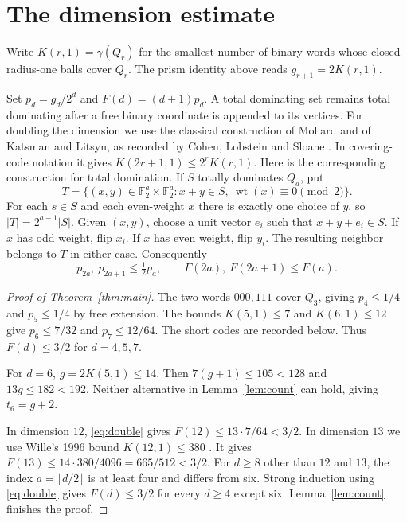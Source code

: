 \documentclass[11pt,a4paper]{article}
\newcommand{\F}{\mathbb F}
\newcommand{\wt}{\operatorname{wt}}
\begin{document}
\section{The dimension estimate}

Write $K(r,1)=\gamma(Q_r)$ for the smallest number of binary
words whose closed radius-one balls cover $Q_r$. The prism identity
above reads $g_{r+1}=2K(r,1)$.

Set $p_d=g_d/2^d$ and $F(d)=(d+1)p_d$. A total dominating set remains
total dominating after a free binary coordinate is appended to its
vertices. For doubling the dimension we use the classical construction
of Mollard and of Katsman and Litsyn, as recorded by Cohen, Lobstein
and Sloane \cite[Theorem 13]{cls}. In covering-code notation it gives
$K(2r+1,1)\le2^rK(r,1)$. Here is the corresponding construction for
total domination. If $S$ totally dominates $Q_a$, put
\[
  T=\{(x,y)\in \F_2^a\times\F_2^a:
           x+y\in S,\ \wt(x)\equiv0\pmod 2\}.
\]
For each $s\in S$ and each even-weight $x$ there is exactly one choice of
$y$, so $|T|=2^{a-1}|S|$. Given $(x,y)$, choose a unit vector $e_i$
such that $x+y+e_i\in S$. If $x$ has odd weight, flip $x_i$. If $x$
has even weight, flip $y_i$. The resulting neighbor belongs to $T$ in
either case. Consequently
\begin{equation}\label{eq:double}
  p_{2a},\ p_{2a+1}\le \tfrac12p_a,
  \qquad F(2a),\ F(2a+1)\le F(a).
\end{equation}

\begin{proof}[Proof of Theorem~\ref{thm:main}]
The two words $000,111$ cover $Q_3$, giving $p_4\le1/4$ and
$p_5\le1/4$ by free extension. The bounds $K(5,1)\le7$ and
$K(6,1)\le12$ give $p_6\le7/32$ and $p_7\le12/64$.
The short codes are recorded below. Thus $F(d)\le3/2$ for $d=4,5,7$.

For $d=6$, $g=2K(5,1)\le14$.
Then $7(g+1)\le105<128$ and $13g\le182<192$. Neither alternative in
Lemma~\ref{lem:count} can hold, giving $t_6=g+2$.

In dimension $12$, \eqref{eq:double} gives $F(12)\le13\cdot7/64<3/2$.
In dimension $13$ we use Wille's 1996 bound $K(12,1)\le380$ \cite{wille}.
It gives $F(13)\le14\cdot380/4096=665/512<3/2$.
For $d\ge8$ other than $12$ and $13$, the index
$a=\lfloor d/2\rfloor$ is at least four and differs from six.
Strong induction using \eqref{eq:double} gives $F(d)\le3/2$ for every
$d\ge4$ except six. Lemma~\ref{lem:count} finishes the proof.
\end{proof}
\end{document}
